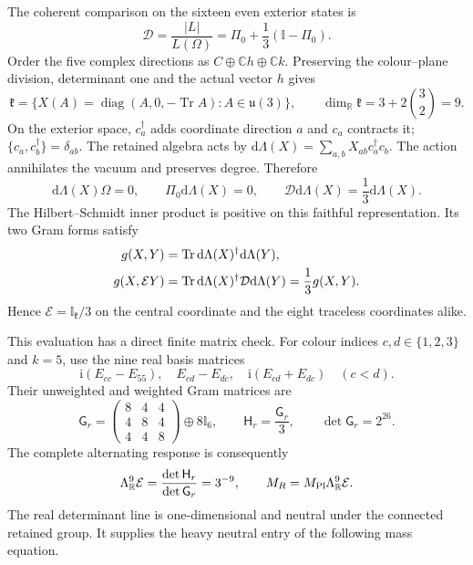 \documentclass[aps,prx,onecolumn,10pt,notitlepage,nofootinbib,longbibliography]{revtex4-2}
\numberwithin{equation}{section}
\numberwithin{table}{section}
\newcommand{\Id}{\mathbb I}
\newcommand{\CC}{\mathbb C}
\newcommand{\RR}{\mathbb R}
\newcommand{\Tr}{\operatorname{Tr}}
\newcommand{\diag}{\operatorname{diag}}
\newcommand{\dd}{\mathrm d}
\newcommand{\ii}{\mathrm i}
\begin{document}
The coherent comparison on the sixteen even exterior states is
\begin{equation}
 {\mathcal D}=\frac{|L|}{L(\Omega)}
  =\Pi_0+\frac13(\Id-\Pi_0).
 \label{eq:coherentcomparison}
\end{equation}
Order the five complex directions as $C\oplus\CC h\oplus\CC k$.
Preserving the colour--plane division, determinant one and the actual vector
$h$ gives
\begin{equation}
 \mathfrak k=\{X(A)=\diag(A,0,-\Tr A):A\in\mathfrak u(3)\},
 \qquad \dim_{\RR}\mathfrak k=3+2\binom32=9.
 \label{eq:neutralalgebra}
\end{equation}
On the exterior space, $c_a^\dagger$ adds coordinate direction $a$ and $c_a$ contracts it; $\{c_a,c_b^\dagger\}=\delta_{ab}$. The retained algebra acts by $\dd\Lambda(X)=\sum_{a,b}X_{ab}c_a^\dagger c_b$.
The action annihilates the vacuum and preserves degree. Therefore
\begin{equation}
 \dd\Lambda(X)\Omega=0,\qquad \Pi_0\dd\Lambda(X)=0,
 \qquad {\mathcal D}\dd\Lambda(X)=\frac13\dd\Lambda(X).
 \label{eq:retainedcomparison}
\end{equation}
The Hilbert--Schmidt inner product is positive on this faithful representation.
Its two Gram forms satisfy
\begin{align}
 g(X,Y)&=\Tr\dd\Lambda(X)^\dagger\dd\Lambda(Y),\notag\\
 g(X,\mathcal EY)&=\Tr\dd\Lambda(X)^\dagger {\mathcal D}\dd\Lambda(Y)
                =\frac13g(X,Y).
 \label{eq:neutralpullback}
\end{align}
Hence $\mathcal E=\Id_{\mathfrak k}/3$ on the central coordinate and the eight
traceless coordinates alike.

This evaluation has a direct finite matrix check. For colour indices
$c,d\in\{1,2,3\}$ and $k=5$, use the nine real basis matrices
\begin{equation}
 \ii(E_{cc}-E_{55}),\quad
 E_{cd}-E_{dc},\quad \ii(E_{cd}+E_{dc})\quad(c<d).
 \label{eq:neutralbasis}
\end{equation}
Their unweighted and weighted Gram matrices are
\begin{equation}
 {\mathsf G_r}=\begin{pmatrix}8&4&4\\4&8&4\\4&4&8\end{pmatrix}\oplus8\Id_6,
 \qquad {\mathsf H_r}=\frac {\mathsf G_r}3,
 \qquad \det {\mathsf G_r}=2^{26}.
 \label{eq:neutralgram}
\end{equation}
The complete alternating response is consequently
\begin{equation}
 \Lambda^9_{\RR}\mathcal E
 =\frac{\det {\mathsf H_r}}{\det {\mathsf G_r}}=3^{-9},
 \qquad M_R=M_{\rm Pl}\Lambda^9_{\RR}\mathcal E.
 \label{eq:neutraldeterminant}
\end{equation}
The real determinant line is one-dimensional and neutral under the connected
retained group. It supplies the heavy neutral entry of the following mass
equation.
\end{document}
